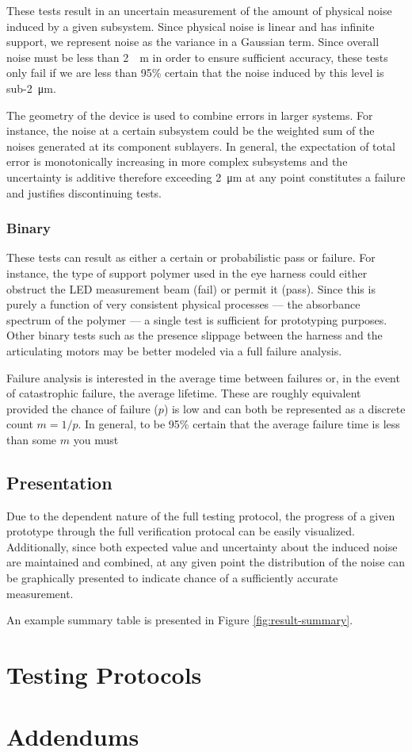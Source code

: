 \documentclass{article}
\begin{document}
These tests result in an uncertain measurement of the amount of
physical noise induced by a given subsystem. Since physical noise is
linear and has infinite support, we represent noise as the variance in
a Gaussian term. Since overall noise must be less than \SI{2}{\micro
  m} in order to ensure sufficient accuracy, these tests only fail if
we are less than 95\% certain that the noise induced by this level is
sub-\SI{2}{\micro m}.

The geometry of the device is used to combine errors in larger
systems. For instance, the noise at a certain subsystem could be the
weighted sum of the noises generated at its component sublayers. In
general, the expectation of total error is monotonically increasing in
more complex subsystems and the uncertainty is additive therefore
exceeding \SI{2}{\micro m} at any point constitutes a failure and
justifies discontinuing tests.

\subsubsection{Binary}
\label{sec:binary}

These tests can result as either a certain or probabilistic pass or
failure. For instance, the type of support polymer used in the eye
harness could either obstruct the LED measurement beam (fail) or
permit it (pass). Since this is purely a function of very consistent
physical processes --- the absorbance spectrum of the polymer --- a
single test is sufficient for prototyping purposes. Other binary tests
such as the presence slippage between the harness and the articulating
motors may be better modeled via a full failure analysis.

Failure analysis is interested in the average time between failures or, in the event of catastrophic failure, the average lifetime. These are roughly equivalent provided the chance of failure ($p$) is low and can both be represented as a discrete count $m = 1/p$. In general, to be 95\% certain that the average failure time is less than some $m$ you must

\subsection{Presentation}
\label{sec:presentation}

Due to the dependent nature of the full testing protocol, the
progress of a given prototype through the full verification protocal
can be easily visualized. Additionally, since both expected value and
uncertainty about the induced noise are maintained and combined, at
any given point the distribution of the noise can be graphically
presented to indicate chance of a sufficiently accurate measurement.

An example summary table is presented in Figure
\ref{fig:result-summary}.

\section{Testing Protocols}
\label{sec:protocols}

%
%

\section{Addendums}
\label{sec:addendums}

\newpage
{}


\end{document}
